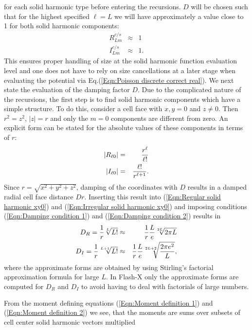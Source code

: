 for each solid harmonic type before entering the recursions. $D$ will be chosen such that for the
highest specified $\ell=L$ we will have approximately a value close to 1 for both
solid harmonic components:
\begin{eqnarray}
R^{c/s}_{Lm} & \approx & 1 \label{Eqn:Damping condition 1} \\
I^{c/s}_{Lm} & \approx & 1.\label{Eqn:Damping condition 2}
\end{eqnarray}
This ensures proper handling of size at the solid harmonic function evaluation level and one
does not have to rely on size cancellations at a later stage when evaluating the potential via
Eq.(\ref{Eqn:Poisson discrete correct real}). We next state the evaluation of the
damping factor $D$. Due to the complicated nature of the recursions, the first step is to
find solid harmonic components which have a simple structure. To do this, consider a cell
face with $x,y=0$ and $z\neq 0$. Then $r^2=z^2$, $|z|=r$ and only the $m=0$ components are
different from zero. An explicit form can be stated for the absolute values of these
components in terms of $r$:
\begin{eqnarray}
\label{Eqn:Regular solid harmonic xy0}
|R_{\ell 0}| & = & {r^\ell\over \ell!} \\
|I_{\ell 0}| & = & {\ell!\over r^{\ell+1}}. \label{Eqn:Irregular solid harmonic xy0}
\end{eqnarray}
Since $r=\sqrt{x^2+y^2+z^2}$, damping of the coordinates with $D$ results in a damped
radial cell face distance $Dr$. Inserting this result into (\ref{Eqn:Regular solid harmonic xy0})
and (\ref{Eqn:Irregular solid harmonic xy0})
and imposing conditions (\ref{Eqn:Damping condition 1}) and (\ref{Eqn:Damping condition 2})
results in
\begin{eqnarray}
\label{Eqn:Damping components}
D_R = {1\over r}\sqrt[L]{L!} & \approx & {1\over r}{L\over e}\sqrt[2L]{2\pi L}\\
D_I = {1\over r}\sqrt[L+1]{L!} & \approx & {1\over r}{L\over e}\sqrt[2L+2]{{2\pi e^2\over L}},
\end{eqnarray}
where the approximate forms are obtained by using Stirling's factorial approximation
formula for large $L$. In Flash-X only the approximate forms are computed for $D_R$ and $D_I$
to avoid having to deal with factorials of large numbers.
\par
From the moment defining equations (\ref{Eqn:Moment definition 1}) and (\ref{Eqn:Moment definition 2})
we see, that the moments are sums over subsets of cell center solid harmonic vectors multiplied
